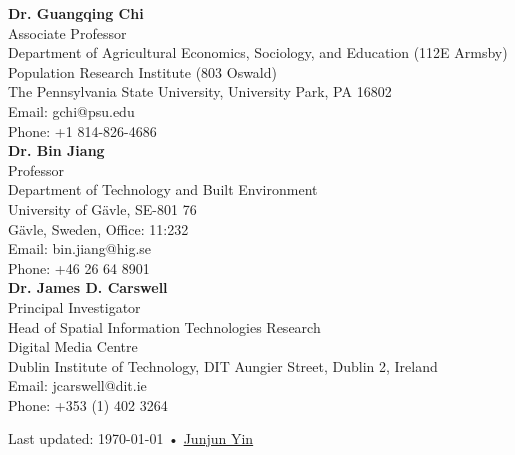 \documentclass[11pt, a4paper]{article}
\begin{document}
\textbf{Dr. Guangqing Chi}\\
Associate Professor\\
Department of Agricultural Economics, Sociology, and Education (112E Armsby)\\
Population Research Institute (803 Oswald)\\
The Pennsylvania State University, University Park, PA 16802\\
Email: gchi@psu.edu\\
Phone: +1 814-826-4686\\

\textbf{Dr. Bin Jiang}\\
Professor\\
Department of Technology and Built Environment\\
University of Gävle, SE-801 76\\
Gävle, Sweden, Office: 11:232\\
Email: bin.jiang@hig.se\\
Phone: +46 26 64 8901\\

\textbf{Dr. James D. Carswell}\\
Principal Investigator\\
Head of Spatial Information Technologies Research\\
Digital Media Centre\\
Dublin Institute of Technology, DIT Aungier Street, Dublin 2, Ireland\\
Email: jcarswell@dit.ie\\
Phone: +353 (1) 402 3264 \\
\vfill{}

\begin{center}
{\scriptsize  Last updated: \today\- •\- 
\href{https://yinjunjun.github.io/home/}{Junjun Yin}}
\end{center}
\end{document}

